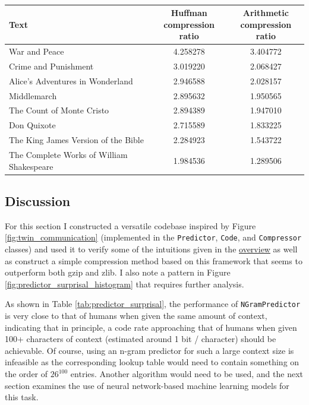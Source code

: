 \begin{table}[h!]
\centering
\begin{tabular}{|l|c|c|}
 \hline
    Text & \makecell{Huffman\\compression ratio} & \makecell{Arithmetic\\compression ratio}\\
 \hline
    War and Peace                             &  4.258278  &  3.404772\\
    Crime and Punishment                      &  3.019220  &  2.068427\\
    Alice's Adventures in Wonderland          &  2.946588  &  2.028157\\
    Middlemarch                               &  2.895632  &  1.950565\\
    The Count of Monte Cristo                 &  2.894389  &  1.947010\\
    Don Quixote                               &  2.715589  &  1.833225\\
    The King James Version of the Bible       &  2.284923  &  1.543722\\
    The Complete Works of William Shakespeare &  1.984536  &  1.289506\\
 \hline
\end{tabular}
\caption{\label{tab:6WPP_performance}}
\end{table}

\subsection{Discussion}

For this section I constructed a versatile codebase inspired by Figure \ref{fig:twin_communication} (implemented in the \texttt{Predictor}, \texttt{Code}, and \texttt{Compressor} classes) and used it to verify some of the intuitions given in the \hyperref[chap:overview]{overview} as well as construct a simple compression method based on this framework that seems to outperform both gzip and zlib. I also note a pattern in Figure \ref{fig:predictor_surprisal_histogram} that requires further analysis.

As shown in Table \ref{tab:predictor_surprisal}, the performance of \texttt{NGramPredictor} is very close to that of humans when given the same amount of context, indicating that in principle, a code rate approaching that of humans when given 100+ characters of context (estimated around 1 bit / character) should be achievable. Of course, using an n-gram predictor for such a large context size is infeasible as the corresponding lookup table would need to contain something on the order of $26^{100}$ entries. Another algorithm would need to be used, and the next section examines the use of neural network-based machine learning models for this task.

